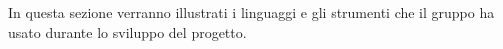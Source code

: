 In questa sezione verranno illustrati i linguaggi e gli strumenti che il gruppo ha usato durante lo sviluppo del progetto.
